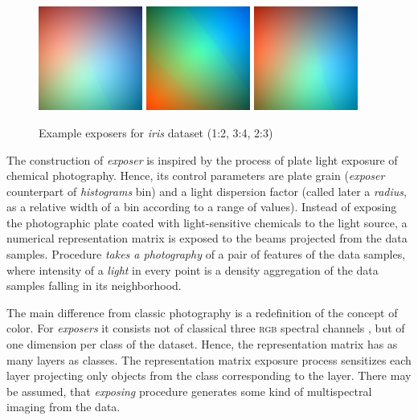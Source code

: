 \documentclass[]{article}
\begin{document}
\begin{figure}[hbt]
	\centering
	\includegraphics[width=0.305\textwidth]{figures/exponer_iris_1_2}
	\includegraphics[width=0.305\textwidth]{figures/exponer_iris_4_3}
	\includegraphics[width=0.305\textwidth]{figures/exponer_iris_3_2}
  	\caption{Example exposers for \emph{iris} dataset (1:2, 3:4, 2:3)}
  	\label{fig:exp1}
\end{figure}

The construction of \emph{exposer} is inspired by the process of plate light exposure of chemical photography. Hence, its control parameters are plate grain (\emph{exposer} counterpart of \emph{histograms} bin) and a light dispersion factor (called later a \emph{radius}, as a relative width of a bin according to a range of values). Instead of exposing the photographic plate coated with light-sensitive chemicals to the light source, a numerical representation matrix is exposed to the beams projected from the data samples. Procedure \emph{takes a photography} of a pair of features of the data samples, where intensity of a \emph{light} in every point is a density aggregation of the data samples falling in its neighborhood. 

The main difference from classic photography is a redefinition of the concept of color. For \emph{exposers} it consists not of classical three \textsc{rgb} spectral channels \cite{svaetichin_spectral_1956}, but of one dimension per class of the dataset. Hence, the representation matrix has as many layers as classes. The representation matrix exposure process sensitizes each layer projecting only objects from the class corresponding to the layer. There may be assumed, that \emph{exposing} procedure generates some kind of multispectral imaging \cite{1703909} from the data. 
\end{document}
